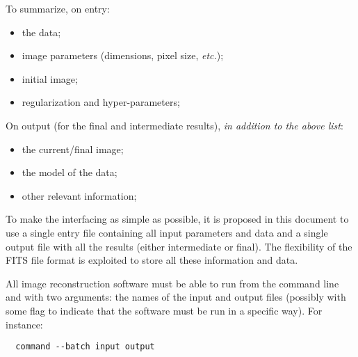 \documentclass{article}
\newcommand*{\ROW}{} %
\newcommand*{\ROWTITLE}{} %
\newcommand{\KEYWORD}[1]{\texttt{#1}} %
\begin{document}


To summarize, on entry:
\begin{itemize}
\item the data;
\item image parameters (dimensions, pixel size, \emph{etc.});
\item initial image;
\item regularization and hyper-parameters;
\end{itemize}
On output (for the final and intermediate results), \emph{in addition
  to the above list}:
\begin{itemize}
\item the current/final image;
\item the model of the data;
\item other relevant information;
\end{itemize}


To make the interfacing as simple as possible, it is proposed in this
document to use a single entry file containing all input parameters
and data and a single output file with all the results (either
intermediate or final).  The flexibility of the FITS file format is
exploited to store all these information and data.

All image reconstruction software must be able to run from the command line
and with two arguments: the names of the input and output files (possibly with
some flag to indicate that the software must be run in a specific way).   For
instance:
\begin{verbatim}
  command --batch input output
\end{verbatim}


\renewcommand{\ROW}[3]{\KEYWORD{#1} & #2 &#3 \\}
\renewcommand{\ROWTITLE}[1]{\multicolumn{3}{c}{\textbf{#1}} \\*
  Keyword & Type & Description \\*}
\end{document}

